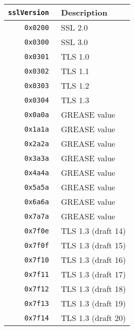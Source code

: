 \documentclass[documentation]{subfiles}
\begin{document}
\begin{minipage}{.48\textwidth}
    \begin{longtable}{>{\tt}rl}
        \toprule
        {\bf sslVersion} & {\bf Description} \\
        \midrule\endhead%
        0x0200 & SSL 2.0\\
        0x0300 & SSL 3.0\\
        0x0301 & TLS 1.0\\
        0x0302 & TLS 1.1\\
        0x0303 & TLS 1.2\\
        0x0304 & TLS 1.3\\
        0x0a0a & GREASE value\\
        0x1a1a & GREASE value\\
        0x2a2a & GREASE value\\
        0x3a3a & GREASE value\\
        0x4a4a & GREASE value\\
        0x5a5a & GREASE value\\
        0x6a6a & GREASE value\\
        0x7a7a & GREASE value\\
        0x7f0e & TLS 1.3 (draft 14)\\
        0x7f0f & TLS 1.3 (draft 15)\\
        0x7f10 & TLS 1.3 (draft 16)\\
        0x7f11 & TLS 1.3 (draft 17)\\
        0x7f12 & TLS 1.3 (draft 18)\\
        0x7f13 & TLS 1.3 (draft 19)\\
        0x7f14 & TLS 1.3 (draft 20)\\
        \bottomrule
    \end{longtable}
\end{minipage}%
\hfill
\end{document}
